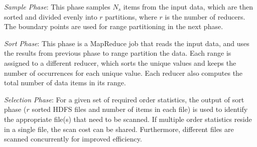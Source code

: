 


\textit{Sample Phase}: This phase samples $N_s$ items from the input data, which are then sorted and divided evenly into $r$ partitions, where $r$ is the number of reducers. The boundary points are used for range partitioning in the next phase.

\textit{Sort Phase}: This phase is a MapReduce job that reads the input data, and uses the results from previous phase to range partition the data. Each range is assigned to a different reducer, which sorts the unique values and keeps the number of occurrences for each unique value. Each reducer also computes the total number of data items in its range.


\textit{Selection Phase}: For a given set of required order statistics, the output of sort phase ($r$ sorted HDFS files and number of items in each file) is used to identify the appropriate file(s) that need to be scanned. If multiple order statistics reside in a single file, the scan cost can be shared. Furthermore, different files are scanned concurrently for improved efficiency.



